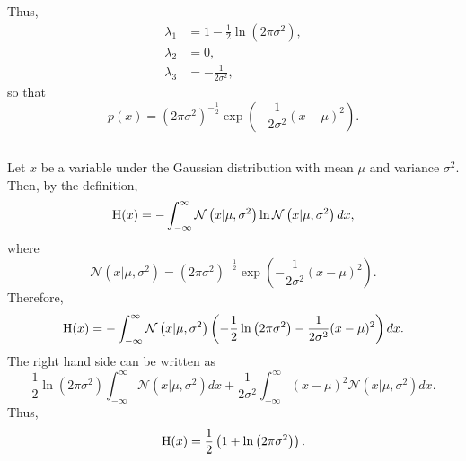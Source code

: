 %
Thus,
%
\begin{equation}
\begin{aligned}
\lambda_1 &= 1 - \frac{1}{2} \ln \left( 2 \pi \sigma ^ 2 \right), \\
\lambda_2 &= 0, \\
\lambda_3 &= - \frac{1}{2 \sigma ^ 2},
\end{aligned}
\end{equation}
%
so that
%
\begin{equation}
p(x) = \left( 2 \pi \sigma ^ 2 \right) ^ {- \frac{1}{2}} \exp \left( - \frac{1}{2 \sigma ^ 2} (x - \mu) ^ 2 \right).
\end{equation}
%


\subsection{}
Let $x$ be a variable under the Gaussian distribution with mean $\mu$ and variance $\sigma ^ 2$.
Then, by the definition,
%
\begin{equation}
{\rm H}(x) = - \int_{- \infty}^{\infty} \mathcal{N} \left( x | \mu, \sigma ^ 2 \right) \ln \mathcal{N} \left( x | \mu, \sigma ^ 2 \right) dx,
\end{equation}
%
where
%
\begin{equation}
\mathcal{N} \left( x | \mu, \sigma ^ 2 \right) = \left( 2 \pi \sigma ^ 2 \right) ^ {- \frac{1}{2}} \exp \left( - \frac{1}{2 \sigma ^2} (x - \mu) ^ 2 \right).
\end{equation}
%
Therefore,
%
\begin{equation}
{\rm H}(x) = - \int_{- \infty}^{\infty} \mathcal{N} \left( x | \mu, \sigma ^ 2 \right) \left( - \frac{1}{2} \ln \left( 2 \pi \sigma ^ 2 \right) - \frac{1}{2 \sigma ^2} (x - \mu) ^ 2 \right) dx.
\end{equation}
%
The right hand side can be written as
%
\begin{equation}
\frac{1}{2} \ln \left( 2 \pi \sigma ^ 2 \right) \int_{- \infty}^{\infty} \mathcal{N} \left( x | \mu, \sigma ^ 2 \right) dx + \frac{1}{2 \sigma ^2} \int_{- \infty}^{\infty} (x - \mu) ^ 2 \mathcal{N} \left( x | \mu, \sigma ^ 2 \right) dx.
\end{equation}
%
Thus,
%
\begin{equation}
{\rm H}(x) = \frac{1}{2} \left( 1 + \ln \left( 2 \pi \sigma ^ 2 \right) \right).
\end{equation}
%


